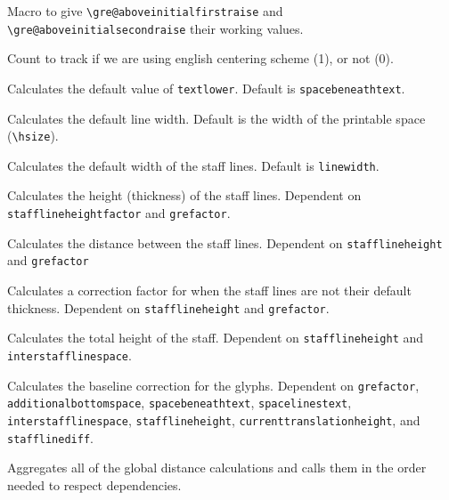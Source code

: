 Macro to give \verb=\gre@aboveinitialfirstraise= and\\
\verb=\gre@aboveinitialsecondraise= their working values.
	
Count to track if we are using english centering scheme (1), or not (0).

Calculates the default value of \texttt{textlower}.  Default is \texttt{spacebeneathtext}.

Calculates the default line width.  Default is the width of the printable space (\verb=\hsize=).

Calculates the default width of the staff lines.  Default is \texttt{linewidth}.

Calculates the height (thickness) of the staff lines.  Dependent on \texttt{stafflineheightfactor} and \texttt{grefactor}.

Calculates the distance between the staff lines.  Dependent on \texttt{stafflineheight} and \texttt{grefactor}

Calculates a correction factor for when the staff lines are not their default thickness.  Dependent on \texttt{stafflineheight} and \texttt{grefactor}.

Calculates the total height of the staff.  Dependent on \texttt{stafflineheight} and \texttt{interstafflinespace}.

Calculates the baseline correction for the glyphs.  Dependent on \texttt{grefactor}, \texttt{additionalbottomspace}, \texttt{spacebeneathtext}, \texttt{spacelinestext}, \texttt{interstafflinespace}, \texttt{stafflineheight}, \texttt{currenttranslationheight}, and \texttt{stafflinediff}.

Aggregates all of the global distance calculations and calls them in the order needed to respect dependencies.

